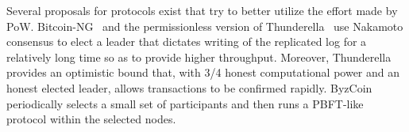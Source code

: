 {%
}{
Several proposals for protocols exist that try to
better utilize the effort made by PoW.
Bitcoin-NG~\cite{EyalGSR16} and the permissionless version of
Thunderella~\cite{PassS18} use Nakamoto consensus to elect a leader that
dictates writing of the replicated log for a relatively long time so as to
provide higher throughput. Moreover, Thunderella provides an
optimistic bound that, with 3/4 honest computational power and an honest
elected leader, allows transactions to be confirmed rapidly.
ByzCoin~\cite{Kokoris-KogiasJ16} periodically selects a small set of
participants and then runs a PBFT-like protocol within the selected nodes. 

}
